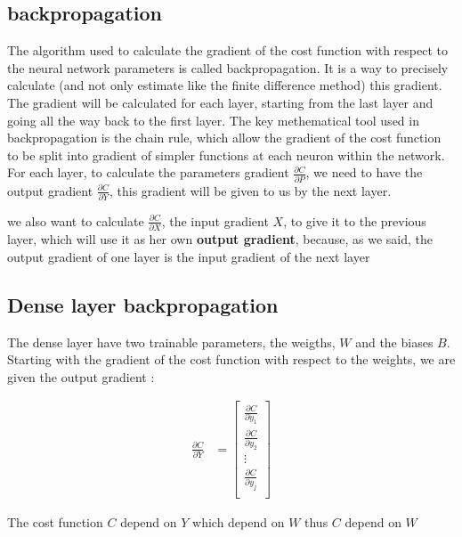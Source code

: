 \documentclass[a4paper, twocolumn, twoside]{article}
\begin{document}
	\subsection{backpropagation}

	The algorithm used to calculate the gradient of the cost function with respect to the neural network parameters
	is called backpropagation. It is a way to precisely calculate
	(and not only estimate like the finite difference method) this gradient.\\
	The gradient will be calculated for each layer,
	starting from the last layer and going all the way back to the first layer.
	The key methematical tool used in backpropagation is the chain rule,
	which allow the gradient of the cost function
	to be split into gradient of simpler functions at each neuron within the network.\\
	For each layer, to calculate the parameters gradient $\frac{\partial C}{\partial P}$,
	we need to have the output gradient $\frac{\partial C}{\partial Y}$,
	this gradient will be given to us by the next layer. 

	we also want to calculate $\frac{\partial C}{\partial X}$, the input gradient $X$, to give it to the previous layer,
	which will use it as her own \textbf{output gradient}, because, as we said, the output gradient of one layer is the input gradient of the next layer

	\subsection{Dense layer backpropagation}

	The dense layer have two trainable parameters, the weigths, $W$ and the biases $B$.
	Starting with the gradient of the cost function with respect to the weights, we are given
	the output gradient :

	\begin{align}
		\frac{\partial C}{\partial Y} &= \begin{bmatrix}
		\frac{\partial C}{\partial y_1} \\
		\frac{\partial C}{\partial y_2} \\
        \vdots \\
	   \frac{\partial C}{\partial y_j} \\
	\end{bmatrix}
	\end{align}

	The cost function $C$ depend on $Y$ which depend on $W$ thus $C$ depend on $W$
\end{document}
